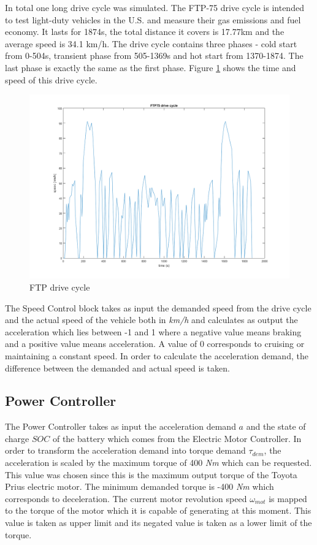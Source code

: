 In total one long drive cycle was simulated. The FTP-75 drive cycle is intended to test light-duty vehicles in the U.S. and measure their gas emissions and fuel economy. It lasts for 1874s, the total distance it covers is 17.77km and the average speed is 34.1 km/h. The drive cycle contains three phases - cold start from 0-504s, transient phase from 505-1369s and hot start from 1370-1874. The last phase is exactly the same as the first phase. Figure \ref{fig:ftp75} shows the time and speed of this drive 
cycle.

\begin{figure}[h]
\centering
\includegraphics[scale=0.45]{figures/FTP75}
\caption{FTP drive cycle}
\label{fig:ftp75}
\end{figure}


The Speed Control block takes as input the demanded speed from the drive cycle and the actual speed of the vehicle both in \textit{km/h} and calculates as output the acceleration which lies between -1 and 1 where a negative value means braking and a positive value means acceleration. A value of 0 corresponds to cruising or maintaining a constant speed. In order to calculate the acceleration demand, the difference between the demanded and actual speed is taken.

\subsection{Power Controller}
\label{subsec:powerContr}
The Power Controller takes as input the acceleration demand $a$ and the state of charge $SOC$ of the battery which comes from the Electric Motor Controller. In order to transform the acceleration demand into torque demand $\tau_{dem}$, the acceleration is scaled by the maximum torque of 400 \textit{Nm} which can be requested. This value was chosen since this is the maximum output torque of the Toyota Prius electric motor. The minimum demanded torque is -400 \textit{Nm} which corresponds to deceleration. The current motor revolution speed $\omega_{mot}$ is mapped to the torque of the motor which it is capable of generating at this moment. This value is taken as upper limit and its negated value is taken as a lower limit of the torque. 


